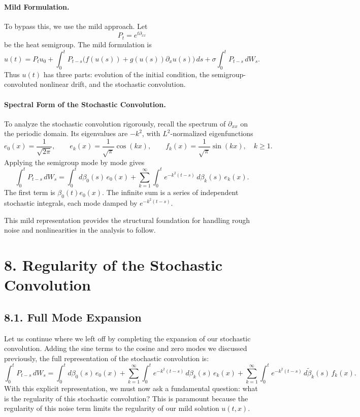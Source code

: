 \documentclass[11pt]{article}
\theoremstyle{definition}
\theoremstyle{remark}
\begin{document}
\paragraph{Mild Formulation.}
To bypass this, we use the mild approach. Let
\[
P_t=e^{t\partial_{xx}}
\]
be the heat semigroup. The mild formulation is
\[
u(t)
=
P_tu_0
+\int_0^t P_{t-s}\bigl(f(u(s))+g(u(s))\partial_xu(s)\bigr)\,ds
+\sigma\int_0^t P_{t-s}\,dW_s.
\]
Thus $u(t)$ has three parts: evolution of the initial condition, the semigroup-convoluted nonlinear drift, and the stochastic convolution.

\paragraph{Spectral Form of the Stochastic Convolution.}
To analyze the stochastic convolution rigorously, recall the spectrum of $\partial_{xx}$ on the periodic domain. Its eigenvalues are $-k^2$, with $L^2$-normalized eigenfunctions
\[
e_0(x)=\frac{1}{\sqrt{2\pi}},\qquad
e_k(x)=\frac{1}{\sqrt{\pi}}\cos(kx),\qquad
f_k(x)=\frac{1}{\sqrt{\pi}}\sin(kx),\quad k\ge1.
\]
Applying the semigroup mode by mode gives
\[
\int_0^t P_{t-s}\,dW_s
=
\int_0^t d\beta_0(s)\,e_0(x)
+\sum_{k=1}^{\infty}\int_0^t e^{-k^2(t-s)}\,d\beta_k(s)\,e_k(x).
\]
The first term is $\beta_0(t)e_0(x)$. The infinite sum is a series of independent stochastic integrals, each mode damped by $e^{-k^2(t-s)}$.

This mild representation provides the structural foundation for handling rough noise and nonlinearities in the analysis to follow.

\section*{8. Regularity of the Stochastic Convolution}
\subsection*{8.1. Full Mode Expansion}
Let us continue where we left off by completing the expansion of our stochastic convolution. Adding the sine terms to the cosine and zero modes we discussed previously, the full representation of the stochastic convolution is:
\[
\int_0^t P_{t-s}\,dW_s
=
\int_0^t d\beta_0(s)\,e_0(x)
+\sum_{k=1}^{\infty}\int_0^t e^{-k^2(t-s)}\,d\beta_k(s)\,e_k(x)
+\sum_{k=1}^{\infty}\int_0^t e^{-k^2(t-s)}\,d\widetilde\beta_k(s)\,f_k(x).
\]
With this explicit representation, we must now ask a fundamental question: what is the regularity of this stochastic convolution? This is paramount because the regularity of this noise term limits the regularity of our mild solution $u(t,x)$.
\end{document}
